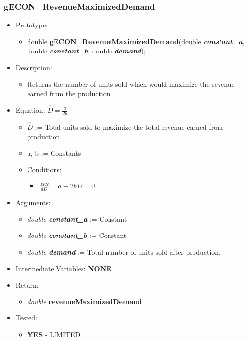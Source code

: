 \documentclass{article}
\begin{document}
{{{{{{%
\cleardoublepage
\subsubsection{gECON\_RevenueMaximizedDemand}

\begin{itemize}
\item Prototype:
	\begin{itemize}
	\item double \textbf{gECON\_RevenueMaximizedDemand}(double \textbf{\textit{constant\_a}}, double \textbf{\textit{constant\_b}}, double \textbf{\textit{demand}});
	\end{itemize}
\item Description:
	\begin{itemize}
	\item Returns the number of units sold which would maximize the revenue earned from the production.
	\end{itemize}
\item Equation:     $\hat{D} = \frac{a}{2b}$
	\begin{itemize}[noitemsep]
	\item $\hat{D}$ := Total units sold to maximize the total revenue earned from production.
	\item a, b := Constants
	\item Conditions:
		\begin{itemize}
		\item $\frac{dTR}{dD} = a - 2bD = 0$
		\end{itemize}
	\end{itemize}
\item Arguments:
	\begin{itemize}[noitemsep]
	\item \textit{double \textbf{constant\_a}} := Constant
	\item \textit{double \textbf{constant\_b}} := Constant
	\item \textit{double \textbf{demand}} := Total number of units sold after production.
	\end{itemize} 
\item Intermediate Variables: \textbf{NONE}
\item Return:
	\begin{itemize}
	\item \textit{double} \textbf{revenueMaximizedDemand}
	\end{itemize}
\item Tested:
	\begin{itemize}
	\item \textbf{YES} - LIMITED
	\end{itemize}
\end{itemize}

}}}}}}
\end{document}
